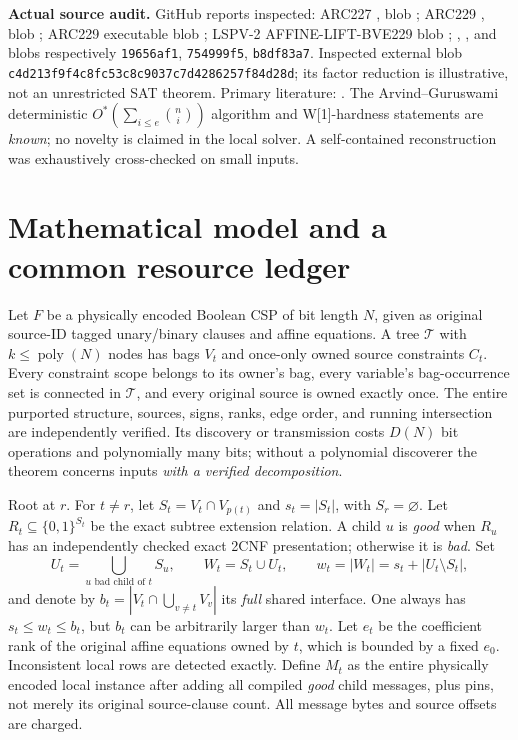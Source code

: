 \documentclass[10pt]{article}
\begin{document}
\noindent\textbf{Actual source audit.} GitHub  reports inspected: ARC227 , blob \texttt{}; ARC229 , blob \texttt{}; ARC229 executable blob \texttt{}; LSPV-2 AFFINE-LIFT-BVE229 blob \texttt{}; , , and  blobs respectively \texttt{19656af1}, \texttt{754999f5}, \texttt{b8df83a7}. Inspected external  blob \texttt{c4d213f9f4c8fc53c8c9037c7d4286257f84d28d}; its factor reduction is illustrative, not an unrestricted SAT theorem. Primary literature: \cite{AG2021,Schaefer1978,Freuder1990}. The Arvind--Guruswami deterministic $O^*(\sum_{i\le e}\binom ni)$ algorithm and W[1]-hardness statements are \emph{known}; no novelty is claimed in the local solver. A self-contained reconstruction was exhaustively cross-checked on small inputs.
\section{Mathematical model and a common resource ledger}
Let $F$ be a physically encoded Boolean CSP of bit length $N$, given as original source-ID tagged unary/binary clauses and affine equations. A tree $\mathcal T$ with $k\le\operatorname{poly}(N)$ nodes has bags $V_t$ and once-only owned source constraints $C_t$. Every constraint scope belongs to its owner's bag, every variable's bag-occurrence set is connected in $\mathcal T$, and every original source is owned exactly once. The entire purported structure, sources, signs, ranks, edge order, and running intersection are independently verified. Its discovery or transmission costs $D(N)$ bit operations and polynomially many bits; without a polynomial discoverer the theorem concerns inputs \emph{with a verified decomposition}.

Root at $r$. For $t\ne r$, let $S_t=V_t\cap V_{p(t)}$ and $s_t=|S_t|$, with $S_r=\varnothing$. Let $R_t\subseteq\{0,1\}^{S_t}$ be the exact subtree extension relation. A child $u$ is \emph{good} when $R_u$ has an independently checked exact 2CNF presentation; otherwise it is \emph{bad}. Set
\[
 U_t=\bigcup_{u\text{ bad child of }t} S_u,\qquad
 W_t=S_t\cup U_t,\qquad w_t=|W_t|=s_t+|U_t\setminus S_t|,\tag{1}
\]
and denote by $b_t=|V_t\cap\bigcup_{v\ne t}V_v|$ its \emph{full} shared interface. One always has $s_t\le w_t\le b_t$, but $b_t$ can be arbitrarily larger than $w_t$. Let $e_t$ be the coefficient rank of the original affine equations owned by $t$, which is bounded by a fixed $e_0$. Inconsistent local rows are detected exactly. Define $M_t$ as the entire physically encoded local instance after adding all compiled \emph{good} child messages, plus pins, not merely its original source-clause count. All message bytes and source offsets are charged.
\end{document}

